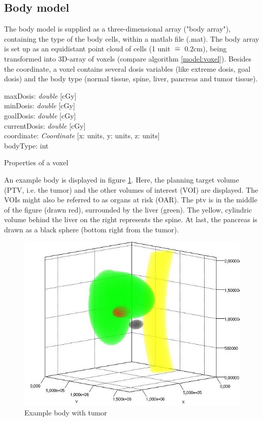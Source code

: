 \documentclass[12pt]{article}
\begin{document}
\subsection{Body model}
The body model is supplied as a three-dimensional array ("body array"), containing the type of the body cells, within a matlab file (.mat). The body array is set up as an equidistant point cloud of cells (1 unit $\widehat{=}$ 0.2cm), being transformed into 3D-array of voxels (compare algorithm \ref{model:voxel}). Besides the coordinate, a voxel contains several dosis variables (like extreme dosis, goal dosis) and the body type (normal tissue, spine, liver, pancreas and tumor tissue). \\
\begin{algorithm}[H]
maxDosis: \textit{double} [cGy] \\
minDosis: \textit{double} [cGy] \\
goalDosis: \textit{double} [cGy] \\
currentDosis: \textit{double} [cGy] \\
coordinate: \textit{Coordinate} [x: units, y: units, z: units] \\
bodyType: int
\label{model:voxel}
\caption{Properties of a voxel}
\end{algorithm}

An example body is displayed in figure \ref{model:body}. Here, the planning target volume (PTV, i.e. the tumor) and the other volumes of interest (VOI) are displayed. The VOIs might also be referred to as organs at risk (OAR). The ptv is in the middle of the figure (drawn red), surrounded by the liver (green). The yellow, cylindric volume behind the liver on the right represents the spine. At last, the pancreas is drawn as a black sphere (bottom right from the tumor).
\begin{figure}
\centering
\includegraphics[width=.7\textwidth]{pictures/body}
\caption{Example body with tumor}
\label{model:body}
\end{figure}
\end{document}

